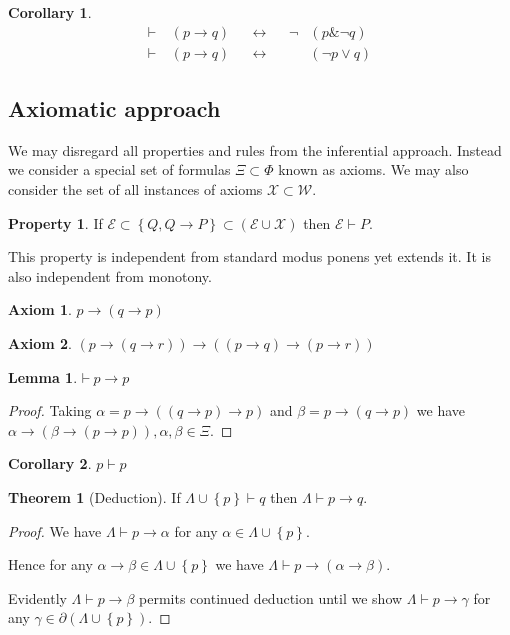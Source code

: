 \documentclass{amsbook}
\newcommand{\setsm}[1]{\left\{#1\right\}}
\newcommand{\wffs}{\mathcal W}
\newcommand{\infers}{\mathrel\vdash}
\newcommand{\theorem}{\mathord\vdash\medspace}
\newcommand{\then}{\mathrel\rightarrow}
\newcommand{\conj}{\mathrel\&}
\newcommand{\eqv}{\mathrel\leftrightarrow}
\newcommand{\disj}{\mathrel\vee}
\theoremstyle{definition}
\newtheorem{axm}{Axiom}[chapter]
\newtheorem{prop}{Property}[section]
\newtheorem{thm}{Theorem}[section]
\newtheorem{lmm}{Lemma}[section]
\newtheorem{crl}{Corollary}[section]
\begin{document}
\begin{crl}
    \begin{align*}
         & \theorem & (p \then q) &  & \eqv &  & \neg & (p \conj \neg q) & \\
         & \theorem & (p \then q) &  & \eqv &  &      & (\neg p \disj q) &
    \end{align*}
\end{crl}

\subsection{Axiomatic approach}

We may disregard all properties and rules from the inferential approach. Instead we consider a special set of formulas $\Xi \subset \Phi$ known as axioms. We may also consider the set of all instances of axioms $\mathcal X \subset \wffs$.

\begin{prop}
    If $\mathcal E \subset \setsm {Q, Q \then P} \subset (\mathcal E \cup \mathcal X)$ then $\mathcal E \infers P$.
\end{prop}

This property is independent from standard modus ponens yet extends it. It is also independent from monotony.

\begin{axm}
    $p \then (q \then p)$
\end{axm}

\begin{axm}
    $(p \then (q \then r)) \then ((p \then q) \then (p \then r))$
\end{axm}

\begin{lmm}
    $\theorem p \then p$
    \begin{proof}
        Taking $\alpha = p \then ((q \then p) \then p)$ and $\beta = p \then (q \then p)$ we have $\alpha \then (\beta \then (p \then p)), \alpha, \beta \in \Xi$.
    \end{proof}
\end{lmm}

\begin{crl}
    $p \infers p$
\end{crl}

\begin{thm}[Deduction]
    If $\varLambda \cup \setsm p \infers q$ then $\varLambda \infers p \then q$.
    \begin{proof}
        We have $\varLambda \infers p \then \alpha$ for any $\alpha \in \varLambda \cup \setsm p$.

        Hence for any $\alpha \then \beta \in \varLambda \cup \setsm p$ we have $\varLambda \infers p \then (\alpha \then \beta)$.

        Evidently $\varLambda \infers p \then \beta$ permits continued deduction until we show $\varLambda \infers p \then \gamma$ for any $\gamma \in \partial(\varLambda \cup \setsm p)$.
    \end{proof}
\end{thm}
\end{document}
